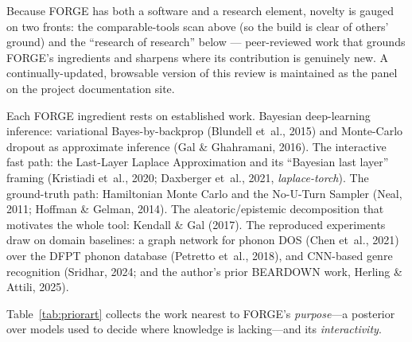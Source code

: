 Because FORGE has both a software and a research element, novelty is gauged on two fronts: the comparable-tools scan above (so the build is clear of others' ground) and the ``research of research'' below --- peer-reviewed work that grounds FORGE's ingredients and sharpens where its contribution is genuinely new. A continually-updated, browsable version of this review is maintained as the  panel on the project documentation site.

Each FORGE ingredient rests on established work. Bayesian deep-learning inference: variational Bayes-by-backprop (Blundell et~al., 2015) and Monte-Carlo dropout as approximate inference (Gal \& Ghahramani, 2016). The interactive fast path: the Last-Layer Laplace Approximation and its ``Bayesian last layer'' framing (Kristiadi et~al., 2020; Daxberger et~al., 2021, \emph{laplace-torch}). The ground-truth path: Hamiltonian Monte Carlo and the No-U-Turn Sampler (Neal, 2011; Hoffman \& Gelman, 2014). The aleatoric/epistemic decomposition that motivates the whole tool: Kendall \& Gal (2017). The reproduced experiments draw on domain baselines: a graph network for phonon DOS (Chen et~al., 2021) over the DFPT phonon database (Petretto et~al., 2018), and CNN-based genre recognition (Sridhar, 2024; and the author's prior BEARDOWN work, Herling \& Attili, 2025).

Table~\ref{tab:priorart} collects the work nearest to FORGE's \emph{purpose}---a posterior over models used to decide where knowledge is lacking---and its \emph{interactivity}.

